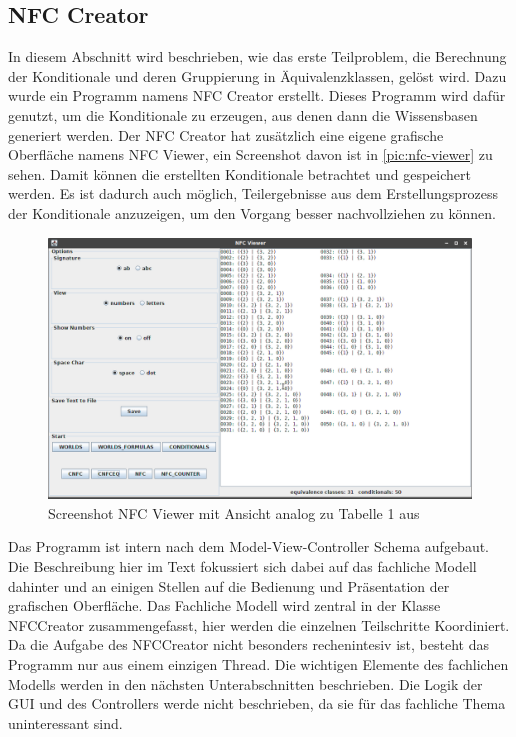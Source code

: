 \documentclass[12pt,a4paper]{article}
\begin{document}
\subsection{NFC Creator}
In diesem Abschnitt wird beschrieben, wie das erste Teilproblem, die Berechnung der Konditionale und deren Gruppierung in Äquivalenzklassen, gelöst wird. Dazu wurde ein Programm namens NFC Creator erstellt. Dieses Programm wird dafür genutzt, um die Konditionale zu erzeugen, aus denen dann die Wissensbasen generiert werden. Der NFC Creator hat zusätzlich eine eigene grafische Oberfläche namens NFC Viewer, ein Screenshot davon ist in \autoref{pic:nfc-viewer} zu sehen. Damit können die erstellten Konditionale betrachtet und gespeichert werden. Es ist dadurch auch möglich, Teilergebnisse aus dem Erstellungsprozess der Konditionale anzuzeigen, um den Vorgang besser nachvollziehen zu können. \\
\begin{figure}
\includegraphics[width=0.8\linewidth]{bilder/nfc-viewer.png}

\caption{Screenshot NFC Viewer mit Ansicht analog zu Tabelle 1 aus \cite{beierle19}}
\label{pic:nfc-viewer}
\end{figure}
Das Programm ist intern nach dem Model-View-Controller Schema aufgebaut. Die Beschreibung hier im Text fokussiert sich dabei auf das fachliche Modell dahinter und an einigen Stellen auf die Bedienung und Präsentation der grafischen Oberfläche. Das Fachliche Modell wird zentral in der Klasse NFCCreator zusammengefasst, hier werden die einzelnen Teilschritte Koordiniert. Da die Aufgabe des NFCCreator nicht besonders rechenintesiv ist, besteht das Programm nur aus einem einzigen Thread. Die wichtigen Elemente des fachlichen Modells werden in den nächsten Unterabschnitten beschrieben. Die Logik der GUI und des Controllers werde nicht beschrieben, da sie für das fachliche Thema uninteressant sind. \\
\end{document}
